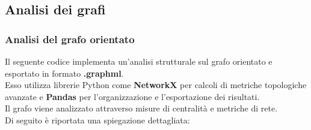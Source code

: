 \documentclass[12pt]{article}
\begin{document}
	\subsection{Analisi dei grafi}
	\subsubsection{Analisi del grafo orientato}
	Il seguente codice implementa un’analisi strutturale sul grafo orientato e esportato in formato \textbf{.graphml}. \\Esso utilizza librerie Python come \textbf{NetworkX} per calcoli di metriche topologiche avanzate e \textbf{Pandas} per l’organizzazione e l’esportazione dei risultati. \\ Il grafo viene analizzato attraverso misure di centralità e metriche di rete. \\Di seguito è riportata una spiegazione dettagliata:
\end{document}
